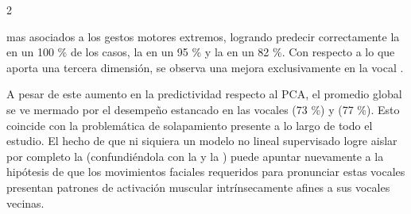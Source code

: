\documentclass[11pt, letterpaper]{article}
\begin{document}
\begin{multicols*}{2}

\noindent mas asociados a los gestos motores extremos, logrando predecir correctamente la  en un 100 \% de los casos, la  en un 95 \% y la  en un 82 \%. Con respecto a lo que aporta una tercera dimensión, se observa una mejora exclusivamente en la vocal .

A pesar de este aumento en la predictividad respecto al PCA, el promedio global se ve mermado por el desempeño estancado en las vocales  (73 \%) y  (77 \%). Esto coincide con la problemática de solapamiento presente a lo largo de todo el estudio. El hecho de que ni
siquiera un modelo no lineal supervisado logre aislar por completo la  (confundiéndola con la  y la ) puede apuntar nuevamente a la hipótesis de que los movimientos faciales requeridos para pronunciar estas vocales  presentan patrones de activación muscular intrínsecamente afines a sus vocales vecinas.


\end{multicols*}
\end{document}
